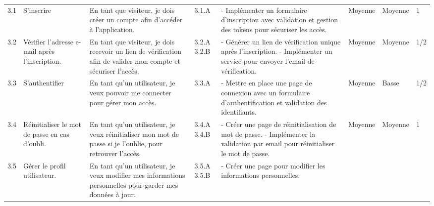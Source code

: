 \begin{landscape}
\begin{spacing}{0.94}
\begin{longtable}{|p{0.7cm}|p{2.4cm}|p{6cm}|p{1cm}|p{7.2cm}|p{0.2cm}|p{0.2cm}|p{2cm}|}
            \hline  
            \rowcolor{blue!20}
			\multicolumn{8}{|c|}{\textbf{EPIC 3: Authentification et gestion du profil }} \\\hline
            3.1 & S'inscrire 
            & En tant que visiteur, je dois créer un compte afin d'accéder à l'application. 
            & 3.1.A
            &
            - Implémenter un formulaire d'inscription avec validation et gestion des tokens pour sécuriser les accès. 
            & Moyenne & Moyenne & 1 \\ \hline
            3.2 & Vérifier l’adresse e-mail après l’inscription. 
                & En tant que visiteur, je dois recevoir un lien de vérification afin de valider mon compte et sécuriser l'accès. 
                & 3.2.A \newline\vspace{0.5cm} 3.2.B 
                &
                - Générer un lien de vérification unique après l'inscription. \newline
                - Implémenter un service pour envoyer l'email de vérification. 
                & Moyenne & Moyenne & 1/2 \\ \hline
            3.3 & S’authentifier
                & En tant qu’un utilisateur, je veux pouvoir me connecter pour gérer mon accès. 
                & 3.3.A&
                - Mettre en place une page de connexion avec un formulaire d’authentification et validation des identifiants.
                & Moyenne & Basse & 1/2 \\ \hline
            3.4 & Réinitialiser le mot de passe en cas d’oubli. 
                & En tant qu’un utilisateur, je veux réinitialiser mon mot de passe si je l'oublie, pour retrouver l'accès. 
                & 3.4.A \newline\vspace{0.5cm} 3.4.B 
                &
                - Créer une page de réinitialisation de mot de passe. \newline
                - Implémenter la validation par email pour réinitialiser le mot de passe. 
                & Moyenne & Moyenne & 1 \\ \hline
            3.5 & Gérer le profil utilisateur. 
                & En tant qu’un utilisateur, je veux modifier mes informations personnelles pour garder mes données à jour. 
                & 3.5.A \newline\vspace{0.5cm} 3.5.B 
                &
                - Créer une page pour modifier les informations personnelles. \newline

\end{longtable}
\end{spacing}
\end{landscape}
